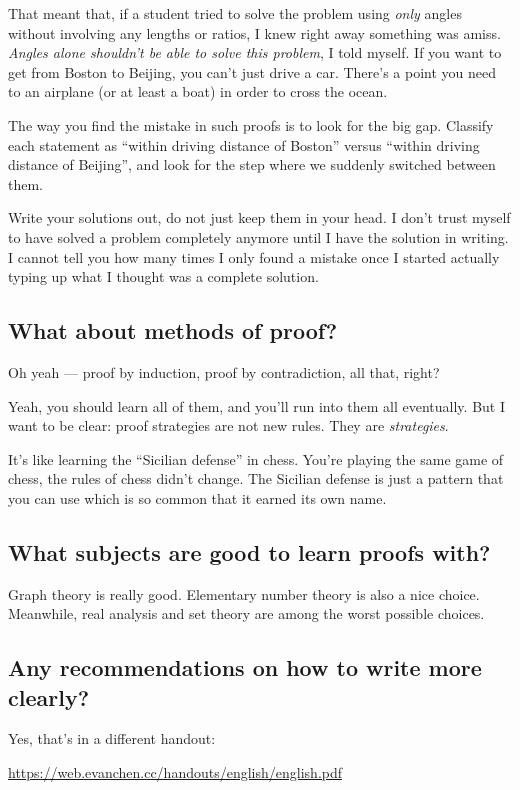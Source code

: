 \documentclass[11pt]{scrartcl}
\begin{document}
\begin{itemize}
  That meant that, if a student tried to solve the problem using \emph{only}
  angles without involving any lengths or ratios,
  I knew right away something was amiss.
  \emph{Angles alone shouldn't be able to solve this problem}, I told myself.
  If you want to get from Boston to Beijing, you can't just drive a car.
  There's a point you need to an airplane (or at least a boat)
  in order to cross the ocean.

  The way you find the mistake in such proofs is to look for the big gap.
  Classify each statement as ``within driving distance of Boston''
  versus ``within driving distance of Beijing'',
  and look for the step where we suddenly switched between them.

  \ii \alert{Write your solutions out, do not just keep them in your head.}
  I don't trust myself to have solved a problem completely anymore
  until I have the solution in writing.
  I cannot tell you how many times I only found a mistake
  once I started actually typing up what I thought was a complete solution.
\end{itemize}

\subsection{What about methods of proof?}
Oh yeah --- proof by induction, proof by contradiction, all that, right?

Yeah, you should learn all of them, and you'll run into them all eventually.
But I want to be clear: \alert{proof strategies are not new rules}.
They are \emph{strategies}.

It's like learning the ``Sicilian defense'' in chess.
You're playing the same game of chess, the rules of chess didn't change.
The Sicilian defense is just a pattern that you can use
which is so common that it earned its own name.

\subsection{What subjects are good to learn proofs with?}
Graph theory is really good. Elementary number theory is also a nice choice.
Meanwhile, real analysis and set theory are among the worst possible choices.

\subsection{Any recommendations on how to write more clearly?}
Yes, that's in a different handout:
\begin{center}
  \url{https://web.evanchen.cc/handouts/english/english.pdf}
\end{center}
\end{document}
